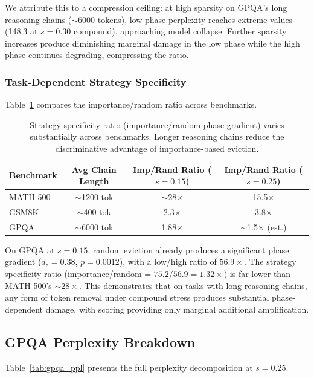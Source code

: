\documentclass[11pt]{article}
\begin{document}
We attribute this to a compression ceiling: at high sparsity on GPQA's long reasoning chains ($\sim$6000 tokens), low-phase perplexity reaches extreme values (148.3 at $s=0.30$ compound), approaching model collapse. Further sparsity increases produce diminishing marginal damage in the low phase while the high phase continues degrading, compressing the ratio.

\subsubsection{Task-Dependent Strategy Specificity}

Table~\ref{tab:strategy_specificity} compares the importance/random ratio across benchmarks.

\begin{table}[h]
\centering
\caption{Strategy specificity ratio (importance/random phase gradient) varies substantially across benchmarks. Longer reasoning chains reduce the discriminative advantage of importance-based eviction.}
\label{tab:strategy_specificity}
\begin{tabular}{lccc}
\toprule
Benchmark & Avg Chain Length & Imp/Rand Ratio ($s=0.15$) & Imp/Rand Ratio ($s=0.25$) \\
\midrule
MATH-500 & $\sim$1200 tok & $\sim$28$\times$ & 15.5$\times$ \\
GSM8K & $\sim$400 tok & 2.3$\times$ & 3.8$\times$ \\
GPQA & $\sim$6000 tok & 1.88$\times$ & $\sim$1.5$\times$ (est.) \\
\bottomrule
\end{tabular}
\end{table}

On GPQA at $s=0.15$, random eviction already produces a significant phase gradient ($d_z = 0.38$, $p = 0.0012$), with a low/high ratio of $56.9\times$. The strategy specificity ratio (importance/random = $75.2/56.9 = 1.32\times$) is far lower than MATH-500's $\sim$$28\times$. This demonstrates that on tasks with long reasoning chains, any form of token removal under compound stress produces substantial phase-dependent damage, with scoring providing only marginal additional amplification.

\subsection{GPQA Perplexity Breakdown}

Table~\ref{tab:gpqa_ppl} presents the full perplexity decomposition at $s=0.25$.
\end{document}
